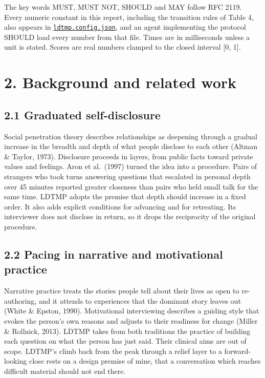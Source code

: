 \documentclass[11pt]{article}
\begin{document}
The key words MUST, MUST NOT, SHOULD and MAY follow RFC 2119. Every
numeric constant in this report, including the transition rules of Table
4, also appears in \href{ldtmp.config.json}{\texttt{ldtmp.config.json}},
and an agent implementing the protocol SHOULD load every number from
that file. Times are in milliseconds unless a unit is stated. Scores are
real numbers clamped to the closed interval {[}0, 1{]}.

\section{2. Background and related work}

\subsection{2.1 Graduated self-disclosure}

Social penetration theory describes relationships as deepening through a
gradual increase in the breadth and depth of what people disclose to
each other (Altman \& Taylor, 1973). Disclosure proceeds in layers, from
public facts toward private values and feelings. Aron et al.~(1997)
turned the idea into a procedure. Pairs of strangers who took turns
answering questions that escalated in personal depth over 45 minutes
reported greater closeness than pairs who held small talk for the same
time. LDTMP adopts the premise that depth should increase in a fixed
order. It also adds explicit conditions for advancing and for
retreating. Its interviewer does not disclose in return, so it drops the
reciprocity of the original procedure.

\subsection{2.2 Pacing in narrative and motivational practice}

Narrative practice treats the stories people tell about their lives as
open to re-authoring, and it attends to experiences that the dominant
story leaves out (White \& Epston, 1990). Motivational interviewing
describes a guiding style that evokes the person's own reasons and
adjusts to their readiness for change (Miller \& Rollnick, 2013). LDTMP
takes from both traditions the practice of building each question on
what the person has just said. Their clinical aims are out of scope.
LDTMP's climb back from the peak through a relief layer to a
forward-looking close rests on a design premise of mine, that a
conversation which reaches difficult material should not end there.
\end{document}
